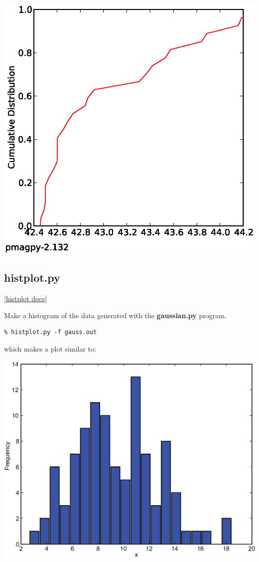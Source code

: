 \documentclass[11pt]{book}
\begin{document}
{{\includegraphics[width=15cm]{EPSfiles/grab_magic_key.eps}


\subsection{histplot.py}
\href{https://github.com/PmagPy/PmagPy/blob/master/programs/histplot.py}{[histplot docs]}

Make a histogram of the data generated with the {\bf gaussian.py} program.



\begin{verbatim}
% histplot.py -f gauss.out
\end{verbatim}

\noindent  which makes a plot similar to:

  \includegraphics[width=15cm]{EPSfiles/hist.eps}

}}
\end{document}
